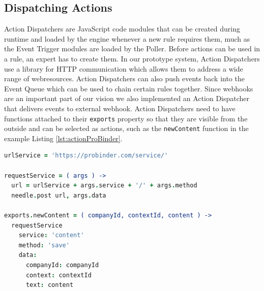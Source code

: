 \subsection{Dispatching Actions}
\textrm{Action Dispatchers} are \textrm{JavaScript} code modules that can be created during runtime and loaded by the engine whenever a new rule requires them, much as the \textrm{Event Trigger} modules are loaded by the \textrm{Poller}.
Before actions can be used in a rule, an expert has to create them.
In our prototype system, \textrm{Action Dispatchers} use a library for \textrm{HTTP} communication which allows them to address a wide range of \textrm{\glspl{webresource}}.
\textrm{Action Dispatchers} can also push events back into the \textrm{Event Queue} which can be used to chain certain rules together.
Since \textrm{\glspl{webhook}} are an important part of our vision we also implemented an \textrm{Action Dispatcher} that delivers events to external \textrm{\gls{webhook}}.
\textrm{Action Dispatchers} need to have functions attached to their \texttt{exports} property so that they are visible from the outside and can be selected as actions, such as the \texttt{newContent} function in the example Listing \ref{lst:actionProBinder}.
\begin{lstlisting}[float=h,label=lst:actionProBinder,language=CoffeeScript,caption=Action Dispatcher code to store a new content on the ProBinder RESTful Web service; written in CoffeeScript]
urlService = 'https://probinder.com/service/'

requestService = ( args ) ->
  url = urlService + args.service + '/' + args.method
  needle.post url, args.data

exports.newContent = ( companyId, contextId, content ) ->
  requestService
    service: 'content'
    method: 'save'
    data:
      companyId: companyId
      context: contextId
      text: content
\end{lstlisting}



